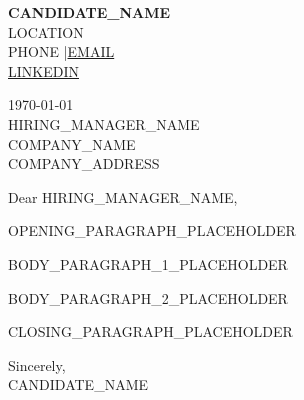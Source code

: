 \documentclass[11pt,letterpaper]{article}
\begin{document}
\begin{flushleft}
{\large\bfseries CANDIDATE\_NAME} \\[2pt]
LOCATION \\
PHONE \enspace|\enspace \href{mailto:EMAIL}{EMAIL} \\
\href{https://LINKEDIN}{LINKEDIN}
\end{flushleft}

\vspace{0.5em}

\begin{flushleft}
\today \\[0.5em]
HIRING\_MANAGER\_NAME \\
COMPANY\_NAME \\
COMPANY\_ADDRESS
\end{flushleft}

\vspace{0.5em}

Dear HIRING\_MANAGER\_NAME,

OPENING\_PARAGRAPH\_PLACEHOLDER

BODY\_PARAGRAPH\_1\_PLACEHOLDER

BODY\_PARAGRAPH\_2\_PLACEHOLDER

CLOSING\_PARAGRAPH\_PLACEHOLDER

Sincerely, \\[1.5em]
CANDIDATE\_NAME
\end{document}
